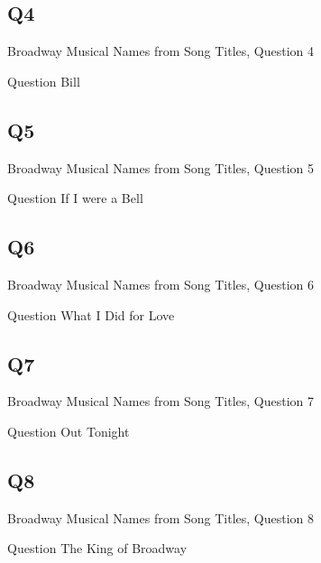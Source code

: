 \documentclass[11pt]{beamer}
\begin{document}
\subsection*{Q4}
\begin{frame}[t]{Broadway Musical Names from Song Titles, Question 4}
\begin{block}{Question}
Bill
\end{block}
\end{frame}
\subsection*{Q5}
\begin{frame}[t]{Broadway Musical Names from Song Titles, Question 5}
\begin{block}{Question}
If I were a Bell
\end{block}
\end{frame}
\subsection*{Q6}
\begin{frame}[t]{Broadway Musical Names from Song Titles, Question 6}
\begin{block}{Question}
What I Did for Love
\end{block}
\end{frame}
\subsection*{Q7}
\begin{frame}[t]{Broadway Musical Names from Song Titles, Question 7}
\begin{block}{Question}
Out Tonight
\end{block}
\end{frame}
\subsection*{Q8}
\begin{frame}[t]{Broadway Musical Names from Song Titles, Question 8}
\begin{block}{Question}
The King of Broadway
\end{block}
\end{frame}
\end{document}

